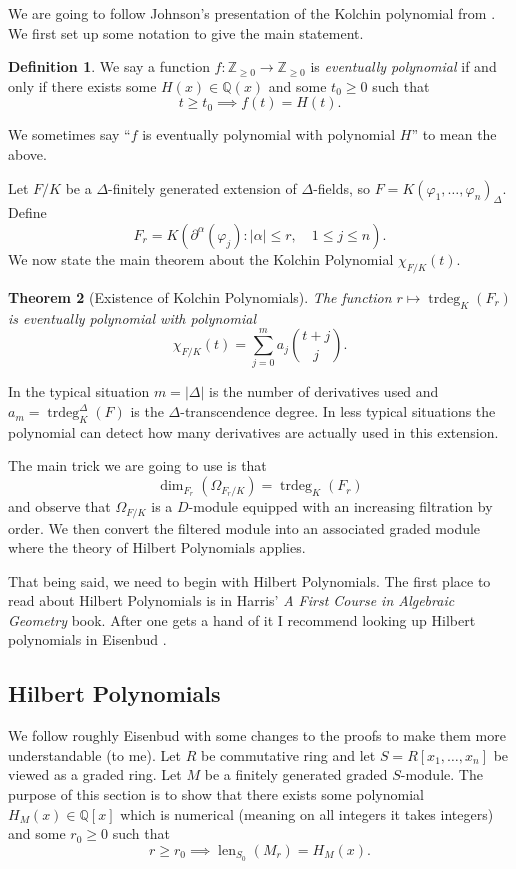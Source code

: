 \documentclass[12pt]{book}
\numberwithin{equation}{section}
\newtheorem{theorem}{Theorem}[subsection]
\theoremstyle{definition}
\newtheorem{definition}[theorem]{Definition}
\theoremstyle{remark}
\newcommand{\trdeg}{\operatorname{trdeg}}
\newcommand{\ZZ}{\mathbb{Z}}
\newcommand{\QQ}{\mathbb{Q}}
\newcommand{\len}{\operatorname{len}}
\begin{document}
We are going to follow Johnson's presentation of the Kolchin polynomial from \cite{Johnson1969}.
We first set up some notation to give the main statement. 
\begin{definition}
	We say a function $f: \ZZ_{\geq 0} \to \ZZ_{\geq 0}$ is \emph{eventually polynomial} if and only if there exists some $H(x) \in \QQ(x)$ and some $t_0\geq 0$ such that 
	$$ t\geq t_0 \implies f(t) = H(t). $$
\end{definition}
We sometimes say ``$f$ is eventually polynomial with polynomial $H$'' to mean the above. 

Let $F/K$ be a $\Delta$-finitely generated extension of $\Delta$-fields, so $ F = K(\varphi_1,\ldots,\varphi_n)_{\Delta}.$
Define 
$$ F_r = K( \partial^{\alpha}(\varphi_j) \colon \vert \alpha \vert \leq r, \quad 1\leq j \leq n).$$
We now state the main theorem about the Kolchin Polynomial $\chi_{F/K}(t)$. 
\begin{theorem}[Existence of Kolchin Polynomials]
	The function $r\mapsto \trdeg_K(F_r)$ is eventually polynomial with polynomial 
	$$\chi_{F/K}(t) = \sum_{j=0}^m a_j {t +j \choose j }. $$
\end{theorem}
In the typical situation $m = \vert \Delta \vert$ is the number of derivatives used and $a_m = \trdeg^{\Delta}_K(F)$ is the $\Delta$-transcendence degree.
In less typical situations the polynomial can detect how many derivatives are actually used in this extension. 

The main trick we are going to use is that 
$$ \dim_{F_r}(\Omega_{F_r/K}) = \trdeg_K(F_r) $$
and observe that $\Omega_{F/K}$ is a $D$-module equipped with an increasing filtration by order. 
We then convert the filtered module into an associated graded module where the theory of Hilbert Polynomials applies.

That being said, we need to begin with Hilbert Polynomials. 
The first place to read about Hilbert Polynomials is in Harris' \emph{A First Course in Algebraic Geometry} book. 
After one gets a hand of it I recommend looking up Hilbert polynomials in Eisenbud \cite{Eisenbud1995}.


\subsection{Hilbert Polynomials}\label{S:hilbert-polynomials}
We follow roughly Eisenbud \cite[\S 1.9, pg 41]{Eisenbud1995} with some changes to the proofs to make them more understandable (to me). 
Let $R$ be commutative ring and let $S = R[x_1,\ldots,x_n]$ be viewed as a graded ring.
Let $M$ be a finitely generated graded $S$-module.
The purpose of this section is to show that there exists some polynomial $H_M(x) \in \QQ[x]$ which is numerical (meaning on all integers it takes integers) and some $r_0\geq 0$ such that 
$$ r\geq r_0 \implies \len_{S_0}(M_r) = H_M(x).$$
\end{document}
